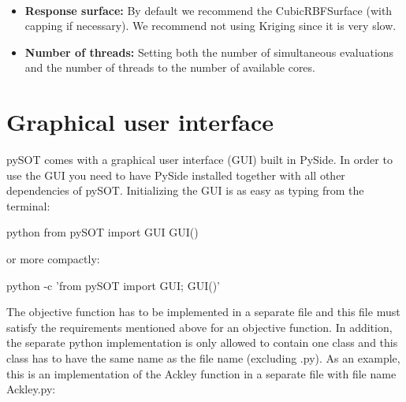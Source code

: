 \documentclass[]{article}
\begin{document}
\ \newline

\begin{itemize}
\item \textbf{Response surface:} By default we recommend the CubicRBFSurface 
(with capping if necessary). We recommend not using Kriging since it is very slow.
\item \textbf{Number of threads:}  Setting both the number of simultaneous evaluations 
and the number of threads to the number of available cores.
\end{itemize}

\section{Graphical user interface}
pySOT comes with a graphical user interface (GUI) built in PySide. In order to use the 
GUI you need to have PySide installed together with all other dependencies of pySOT. 
Initializing the GUI is as easy as typing from the terminal:
\begin{python}
python
from pySOT import GUI
GUI()
\end{python} 
or more compactly:
\begin{python}
python -c 'from pySOT import GUI; GUI()'
\end{python}
The objective function has to be implemented in a separate file and this file must satisfy 
the requirements mentioned above for an objective function. In addition, the separate 
python implementation is only allowed to contain one class and this class has to have 
the same name as the file name (excluding .py). As an example, this is an implementation 
of the Ackley function in a separate file with file name Ackley.py:
\end{document}
